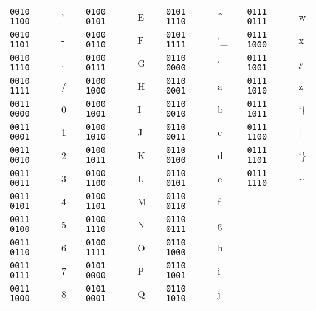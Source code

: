 \documentclass[a4paper, landscape]{scrartcl}
\begin{document}
\begin{tabularx}{\textwidth}{|YY|Y|YY|Y|YY|Y|YY|}
	\texttt{0010 1100} & \textquoteright   &  & \texttt{0100 0101} & E       &  & \texttt{0101 1110} & \^{}           &  & \texttt{0111 0111} & w        \\
	\texttt{0010 1101} & -                 &  & \texttt{0100 0110} & F       &  & \texttt{0101 1111} & \char`\_       &  & \texttt{0111 1000} & x        \\
	\texttt{0010 1110} & .                 &  & \texttt{0100 0111} & G       &  & \texttt{0110 0000} & \textquoteleft &  & \texttt{0111 1001} & y        \\
	\texttt{0010 1111} & /                 &  & \texttt{0100 1000} & H       &  & \texttt{0110 0001} & a              &  & \texttt{0111 1010} & z        \\
	\texttt{0011 0000} & 0                 &  & \texttt{0100 1001} & I       &  & \texttt{0110 0010} & b              &  & \texttt{0111 1011} & \char`\{ \\
	\texttt{0011 0001} & 1                 &  & \texttt{0100 1010} & J       &  & \texttt{0110 0011} & c              &  & \texttt{0111 1100} & |        \\
	\texttt{0011 0010} & 2                 &  & \texttt{0100 1011} & K       &  & \texttt{0110 0100} & d              &  & \texttt{0111 1101} & \char`\} \\
	\texttt{0011 0011} & 3                 &  & \texttt{0100 1100} & L       &  & \texttt{0110 0101} & e              &  & \texttt{0111 1110} & \~{}     \\
	\texttt{0011 0101} & 4                 &  & \texttt{0100 1101} & M       &  & \texttt{0110 0110} & f              &  &                     &         \\
	\texttt{0011 0100} & 5                 &  & \texttt{0100 1110} & N       &  & \texttt{0110 0111} & g              &  &                     &      \\
	\texttt{0011 0110} & 6                 &  & \texttt{0100 1111} & O       &  & \texttt{0110 1000} & h              &  &                     &          \\
	\texttt{0011 0111} & 7                 &  & \texttt{0101 0000} & P       &  & \texttt{0110 1001} & i              &  &                     &          \\
	\texttt{0011 1000} & 8                 &  & \texttt{0101 0001} & Q       &  & \texttt{0110 1010} & j              &  &                     &          \\
\end{tabularx}
\end{document}
